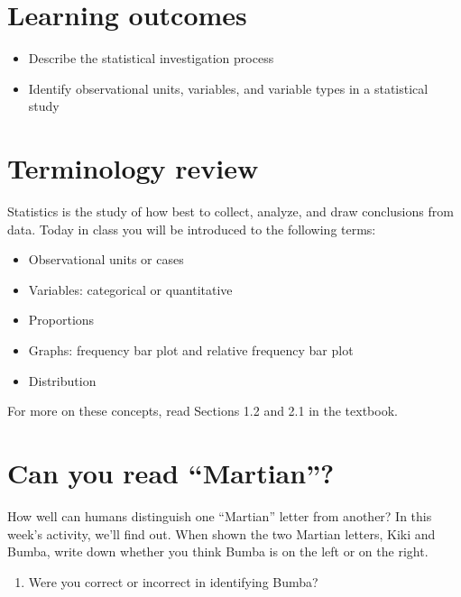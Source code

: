 \documentclass[
]{report}
\providecommand{\tightlist}{%
  \setlength{\itemsep}{0pt}\setlength{\parskip}{0pt}}
\begin{document}

\hypertarget{learning-outcomes}{%
\section{Learning outcomes}\label{learning-outcomes}}

\begin{itemize}
\item
  Describe the statistical investigation process
\item
  Identify observational units, variables, and variable types in a statistical study
\end{itemize}

\hypertarget{terminology-review}{%
\section{Terminology review}\label{terminology-review}}

Statistics is the study of how best to collect, analyze, and draw conclusions from data. Today in class you will be introduced to the following terms:

\begin{itemize}
\item
  Observational units or cases
\item
  Variables: categorical or quantitative
\item
  Proportions
\item
  Graphs: frequency bar plot and relative frequency bar plot
\item
  Distribution
\end{itemize}

For more on these concepts, read Sections 1.2 and 2.1 in the textbook.

\hypertarget{can-you-read-martian}{%
\section{Can you read ``Martian''?}\label{can-you-read-martian}}

How well can humans distinguish one ``Martian'' letter from another? In this week's activity, we'll find out. When shown the two Martian letters, Kiki and Bumba, write down whether you think Bumba is on the left or on the right.
\vspace{2mm}

\begin{enumerate}
\def\labelenumi{\arabic{enumi}.}
\tightlist
\item
  Were you correct or incorrect in identifying Bumba?
\end{enumerate}
\end{document}
